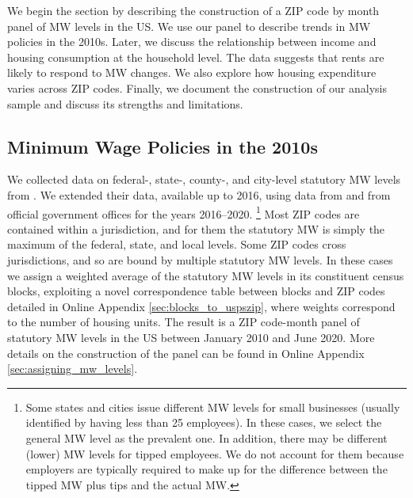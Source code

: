 
We begin the section by describing the construction of a ZIP code by month panel
of MW levels in the US.
We use our panel to describe trends in MW policies in the 2010s.
Later, we discuss the relationship between income and housing consumption at the
household level.
The data suggests that rents are likely to respond to MW changes.
We also explore how housing expenditure varies across ZIP codes.
Finally, we document the construction of our analysis sample and discuss
its strengths and limitations.

\subsection{Minimum Wage Policies in the 2010s}
\label{sec:data_mw_panel}

We collected data on federal-, state-, county-, and city-level statutory MW 
levels from \textcite{VaghulZipperer2016}.
We extended their data, available up to 2016, using data from 
\textcite{BerkeleyLaborCenter} and from official government offices for the 
years 2016--2020.%
\footnote{Some states and cities issue different MW levels for small businesses
    (usually identified by having less than 25 employees).
    In these cases, we select the general MW level as the prevalent one.
    In addition, there may be different (lower) MW levels for tipped employees.
    We do not account for them because employers are typically required to make 
    up for the difference between the tipped MW plus tips and the actual MW.}
%
%
Most ZIP codes are contained within a jurisdiction, and for them the statutory 
MW is simply the maximum of the federal, state, and local levels.
Some ZIP codes cross jurisdictions, and so are bound by multiple statutory MW 
levels.
In these cases we assign a weighted average of the statutory MW levels in its
constituent census blocks, exploiting a novel correspondence table between 
blocks and ZIP codes detailed in Online Appendix \ref{sec:blocks_to_uspszip}, 
where weights correspond to the number of housing units.
The result is a ZIP code-month panel of statutory MW levels in the US between
January 2010 and June 2020.
More details on the construction of the panel can be found in Online Appendix 
\ref{sec:assigning_mw_levels}.

